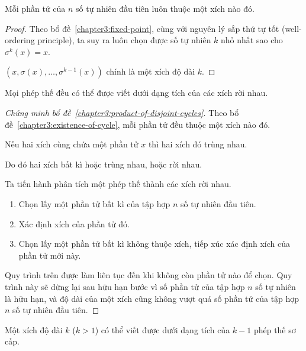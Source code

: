 \documentclass[class=nhvh-linear-algebra,crop=false]{standalone}
\begin{document}
\begin{lemma}\label{chapter3:existence-of-cycle}
	Mỗi phần tử của $n$ số tự nhiên đầu tiên luôn thuộc một xích nào đó.
\end{lemma}

\begin{proof}
	\par Theo bổ đề~\ref{chapter3:fixed-point}, cùng với nguyên lý sắp thứ tự tốt (well-ordering principle), ta suy ra luôn chọn được số tự nhiên $k$ nhỏ nhất sao cho $\sigma^{k}(x) = x$.
	\par $(x, \sigma(x), \ldots, \sigma^{k-1}(x))$ chính là một xích độ dài $k$.
\end{proof}

\begin{lemma}\label{chapter3:product-of-disjoint-cycles}
	Mọi phép thế đều có thể được viết dưới dạng tích của các xích rời nhau.
\end{lemma}

\begin{proof}[Chứng minh bổ đề~\ref{chapter3:product-of-disjoint-cycles}]
	\par Theo bổ đề~\ref{chapter3:existence-of-cycle}, mỗi phần tử đều thuộc một xích nào đó.
	\par Nếu hai xích cùng chứa một phần tử $x$ thì hai xích đó trùng nhau.
	\par Do đó hai xích bất kì hoặc trùng nhau, hoặc rời nhau.
	\par Ta tiến hành phân tích một phép thế thành các xích rời nhau.
	\begin{enumerate}[label = (\arabic*)]
		\item Chọn lấy một phần tử bất kì của tập hợp $n$ số tự nhiên đầu tiên.
		\item Xác định xích của phần tử đó.
		\item Chọn lấy một phần tử bất kì không thuộc xích, tiếp xúc xác định xích của phần tử mới này.
	\end{enumerate}
	\par Quy trình trên được làm liên tục đến khi không còn phần tử nào để chọn. Quy trình này sẽ dừng lại sau hữu hạn bước vì số phần tử của tập hợp $n$ số tự nhiên là hữu hạn, và độ dài của một xích cũng không vượt quá số phần tử của tập hợp $n$ số tự nhiên đầu tiên.
\end{proof}

\begin{lemma}\label{chapter3:product-of-transpositions}
	Một xích độ dài $k$ ($k > 1$) có thể viết được dưới dạng tích của $k-1$ phép thế sơ cấp.
\end{lemma}
\end{document}
